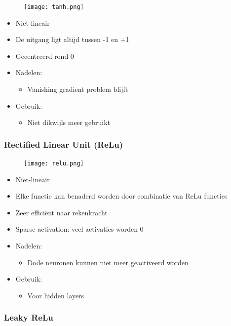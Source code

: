 \documentclass{article}
\begin{document}
\begin{figure}[H]
    \centering
    \texttt{[image: tanh.png]}
\end{figure}


\begin{itemize}
    \item Niet-lineair
    \item De uitgang ligt altijd tussen -1 en +1
    \item Gecentreerd rond 0
    \item Nadelen:
    \begin{itemize}
        \item Vanishing gradient problem blijft
    \end{itemize}
    \item Gebruik:
    \begin{itemize}
        \item Niet dikwijls meer gebruikt
    \end{itemize}
\end{itemize}

\subsubsection{Rectified Linear Unit (ReLu)}

\begin{figure}[H]
    \centering
    \texttt{[image: relu.png]}
\end{figure}

\begin{itemize}
    \item Niet-lineair
    \item Elke functie kan benaderd worden door combinatie van ReLu functies
    \item Zeer efficiënt naar rekenkracht
    \item Sparse activation: veel activaties worden 0
    \item Nadelen:
    \begin{itemize}
        \item Dode neuronen kunnen niet meer geactiveerd worden
    \end{itemize}
    \item Gebruik:
    \begin{itemize}
        \item Voor hidden layers
    \end{itemize}
\end{itemize}


\subsubsection{Leaky ReLu}
\end{document}
